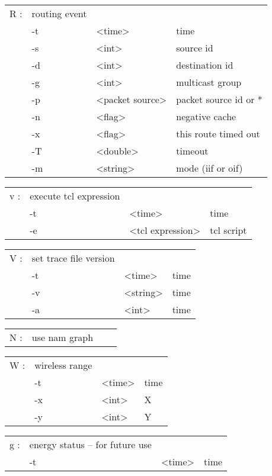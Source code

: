   \begin{tabular}{llll}
  R : & routing event & & \\
    &  -t & <time> & time \\
    &  -s & <int> & source id \\
    &  -d & <int> & destination id \\
    &  -g & <int> & multicast group \\
    &  -p & <packet source> & packet source id or * \\
    &  -n & <flag> & negative cache \\
    &  -x & <flag> & this route timed out \\
    &  -T & <double> & timeout \\
    &  -m & <string> & mode (iif or oif) \\
  \end{tabular}

  \begin{tabular}{llll}
  v : & execute tcl expression & & \\
    &  -t & <time> & time \\
    &  -e & <tcl expression> & tcl script \\
  \end{tabular}

  \begin{tabular}{llll}
  V : & set trace file version & & \\
    &  -t & <time> & time \\
    &  -v & <string> & time \\
    &  -a & <int> & time \\
  \end{tabular}

  \begin{tabular}{llll}
  N : & use nam graph & & \\
  \end{tabular}

  \begin{tabular}{llll}
  W : & wireless range & & \\
    &  -t & <time> & time \\
    &  -x & <int> & X \\
    &  -y & <int> & Y \\
  \end{tabular}

  \begin{tabular}{llll}
  g : & energy status -- for future use & & \\
    &  -t & <time> & time \\
  \end{tabular}

